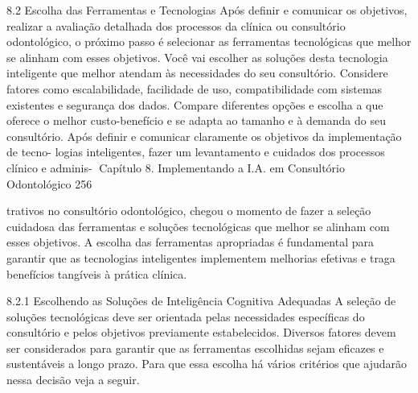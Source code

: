 8.2       Escolha das Ferramentas e Tecnologias
Após definir e comunicar os objetivos, realizar a avaliação detalhada dos processos
da clínica ou consultório odontológico, o próximo passo é selecionar as ferramentas
tecnológicas que melhor se alinham com esses objetivos.
        Você vai escolher as soluções desta tecnologia inteligente que melhor atendam
às necessidades do seu consultório. Considere fatores como escalabilidade, facilidade
de uso, compatibilidade com sistemas existentes e segurança dos dados. Compare
diferentes opções e escolha a que oferece o melhor custo-benefício e se adapta ao
tamanho e à demanda do seu consultório.
         Após definir e comunicar claramente os objetivos da implementação de tecno-
logias inteligentes, fazer um levantamento e cuidados dos processos clínico e adminis-
Capítulo 8. Implementando a I.A. em Consultório Odontológico                        256


trativos no consultório odontológico, chegou o momento de fazer a seleção cuidadosa
das ferramentas e soluções tecnológicas que melhor se alinham com esses objetivos.
         A escolha das ferramentas apropriadas é fundamental para garantir que as
tecnologias inteligentes implementem melhorias efetivas e traga benefícios tangíveis à
prática clínica.

8.2.1    Escolhendo as Soluções de Inteligência Cognitiva Adequadas
A seleção de soluções tecnológicas deve ser orientada pelas necessidades específicas
do consultório e pelos objetivos previamente estabelecidos. Diversos fatores devem ser
considerados para garantir que as ferramentas escolhidas sejam eficazes e sustentáveis
a longo prazo. Para que essa escolha há vários critérios que ajudarão nessa decisão
veja a seguir.

